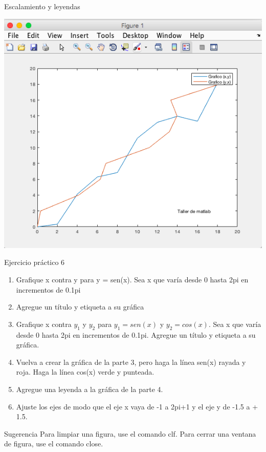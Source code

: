 \documentclass{bredelebeamer}
\begin{document}
\begin{frame}{Escalamiento y leyendas}
\begin{center}
\includegraphics[scale=0.35]{images/pantalla19.png}
\end{center}
\end{frame}

\begin{frame}{Ejercicio práctico 6}
\begin{enumerate}
\item Grafique x contra y para y = sen(x). Sea x que varía desde 0 hasta 2pi en incrementos de 0.1pi
\item Agregue un título y etiqueta a su gráfica
\item Grafique x contra $y_1$ y $y_2$ para $y_1 = sen(x)$ y $y_2 = cos(x)$. Sea x que varía desde 0 hasta 2pi en incrementos de 0.1pi. Agregue un título y etiqueta a su gráfica.
\item Vuelva a crear la gráfica de la parte 3, pero haga la línea sen(x) rayada y roja. Haga la línea cos(x) verde y punteada.
\item Agregue una leyenda a la gráfica de la parte 4.
\item Ajuste los ejes de modo que el eje x vaya de -1 a 2pi+1 y el eje y de -1.5 a + 1.5.
\end{enumerate}
\begin{block}{Sugerencia}
Para limpiar una figura, use el comando clf. Para cerrar una ventana de figura, use el comando close.
\end{block}
\end{frame}
\end{document}
